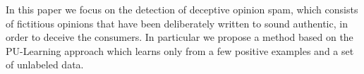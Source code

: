In this paper we focus on the detection of deceptive opinion spam, which consists
 of fictitious opinions that have been deliberately
 written to sound authentic, in order
 to deceive the consumers. In particular we
 propose a method based on the PU-Learning
 approach which learns only from a few positive
 examples and a set of unlabeled data.

